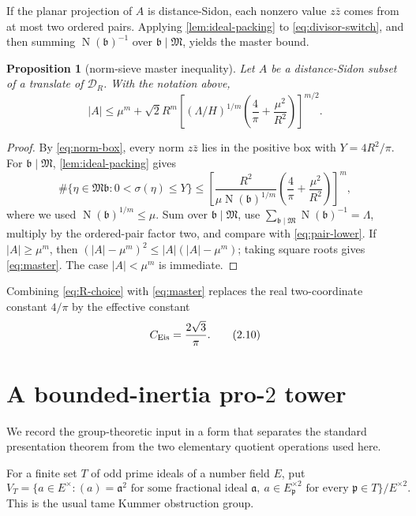 \documentclass[11pt]{article}
\newtheorem{proposition}[theorem]{Proposition}
\theoremstyle{definition}
\theoremstyle{remark}
\newcommand{\cM}{\mathfrak M}
\newcommand{\Nm}{\operatorname N}
\begin{document}
If the planar projection of $A$ is distance-Sidon, each nonzero value
$z\bar z$ comes from at most two ordered pairs.  Applying
\cref{lem:ideal-packing} to \eqref{eq:divisor-switch}, and then summing
$\Nm(\mathfrak b)^{-1}$ over $\mathfrak b\mid\cM$, yields the master bound.

\begin{proposition}[norm-sieve master inequality]\label{prop:master}
Let $A$ be a distance-Sidon subset of a translate of $\mathcal D_R$.
With the notation above,
\[
 |A|\le \mu^m+\sqrt2R^m
 \left[(\Lambda/H)^{1/m}
       \left(\frac4\pi+\frac{\mu^2}{R^2}\right)
 \right]^{m/2}.                                  \tag{2.9}\label{eq:master}
\]
\end{proposition}

\begin{proof}
By \eqref{eq:norm-box}, every norm $z\bar z$ lies in the positive box with
$Y=4R^2/\pi$.  For $\mathfrak b\mid\cM$,
\cref{lem:ideal-packing} gives
\[
 \#\{\eta\in\cM\mathfrak b:0<\sigma(\eta)\le Y\}
 \le\left[
 \frac{R^2}{\mu\Nm(\mathfrak b)^{1/m}}
 \left(\frac4\pi+\frac{\mu^2}{R^2}\right)
 \right]^m,
\]
where we used $\Nm(\mathfrak b)^{1/m}\le\mu$.  Sum over
$\mathfrak b\mid\cM$, use
$\sum_{\mathfrak b\mid\cM}\Nm(\mathfrak b)^{-1}=\Lambda$, multiply by
the ordered-pair factor two, and compare with \eqref{eq:pair-lower}.  If
$|A|\ge\mu^m$, then
$(|A|-\mu^m)^2\le |A|(|A|-\mu^m)$; taking square roots gives
\eqref{eq:master}.
The case $|A|<\mu^m$ is immediate.
\end{proof}

Combining \eqref{eq:R-choice} with \eqref{eq:master} replaces the real
two-coordinate
constant $4/\pi$ by the effective constant
\[
 C_{\rm Eis}=\frac{2\sqrt3}{\pi}.                 \tag{2.10}
\]

\section{A bounded-inertia pro-$2$ tower}

We record the group-theoretic input in a form that separates the standard
presentation theorem from the two elementary quotient operations used here.

For a finite set $T$ of odd prime ideals of a number field $E$, put
\[
 V_T=\{a\in E^\times:(a)=\mathfrak a^2\text{ for some fractional ideal }
 \mathfrak a,\ a\in E_{\mathfrak p}^{\times2}\text{ for every }
 \mathfrak p\in T\}/E^{\times2}.                  \tag{3.1}
\]
This is the usual tame Kummer obstruction group.
\end{document}
